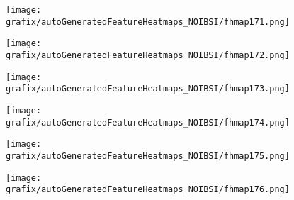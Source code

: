 \hspace{\hsp} 
\begin{subfigure}{\wid\textwidth} 
    \centering 
    \caption{\tiny \sffamily {}} 
    \vspace{\vsp} 
    \texttt{[image: grafix/autoGeneratedFeatureHeatmaps\_NOIBSI/fhmap171.png]} 
\end{subfigure} 
\hspace{\hsp} 
\begin{subfigure}{\wid\textwidth} 
    \centering 
    \caption{\tiny \sffamily {}} 
    \vspace{\vsp} 
    \texttt{[image: grafix/autoGeneratedFeatureHeatmaps\_NOIBSI/fhmap172.png]} 
\end{subfigure} 
\hspace{\hsp} 
\begin{subfigure}{\wid\textwidth} 
    \centering 
    \caption{\tiny \sffamily {}} 
    \vspace{\vsp} 
    \texttt{[image: grafix/autoGeneratedFeatureHeatmaps\_NOIBSI/fhmap173.png]} 
\end{subfigure} 
\hspace{\hsp} 
\begin{subfigure}{\wid\textwidth} 
    \centering 
    \caption{\tiny \sffamily {}} 
    \vspace{\vsp} 
    \texttt{[image: grafix/autoGeneratedFeatureHeatmaps\_NOIBSI/fhmap174.png]} 
\end{subfigure} 
\hspace{\hsp} 
\begin{subfigure}{\wid\textwidth} 
    \centering 
    \caption{\tiny \sffamily {}} 
    \vspace{\vsp} 
    \texttt{[image: grafix/autoGeneratedFeatureHeatmaps\_NOIBSI/fhmap175.png]} 
\end{subfigure} 
\hspace{\hsp} 
\begin{subfigure}{\wid\textwidth} 
    \centering 
    \caption{\tiny \sffamily {}} 
    \vspace{\vsp} 
    \texttt{[image: grafix/autoGeneratedFeatureHeatmaps\_NOIBSI/fhmap176.png]} 
\end{subfigure} 
\hspace{\hsp} 
